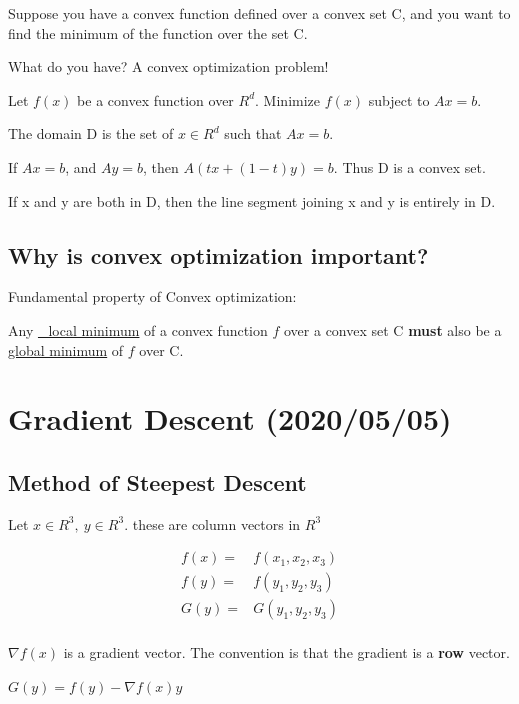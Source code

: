 \documentclass[11pt]{article}
\begin{document}
Suppose you have a convex function defined over a convex set C, and you want to
find the minimum of the function over the set C.

What do you have? A convex optimization problem!

Let \(f(x)\) be a convex function over \(R^d\). Minimize \(f(x)\) subject to \(Ax = b\).

The domain D is the set of \(x \in R^d\) such that \(Ax = b\).

If \(Ax = b\), and \(Ay = b\), then \(A(tx + (1 - t)y) = b\). Thus D is a convex set.

If x and y are both in D, then the line segment joining x and y is entirely in D.

\subsection{Why is convex optimization important?}
\label{sec:org83ec00c}

Fundamental property of Convex optimization:

Any \uline{\_local minimum} of a convex function \(f\) over a convex set C \textbf{must} also be
a \uline{global minimum} of \(f\) over C.
\section{Gradient Descent (2020/05/05)}
\label{sec:orga0cf17c}

\subsection{Method of Steepest Descent}
\label{sec:org04e285f}

Let \(x \in R^3, \ y \in R^3\). these are column vectors in \(R^3\)

\begin{equation}
\begin{split}
f(x) = & f(x_1, x_2, x_3)\\
f(y) = & f(y_1, y_2, y_3)\\
G(y) = & G(y_1, y_2, y_3)\\
\end{split}
\end{equation}

\(\nabla f(x)\) is a gradient vector. The convention is that the gradient is a
\textbf{row} vector.

\(G(y) = f(y) - \nabla f(x) y\)
\end{document}
